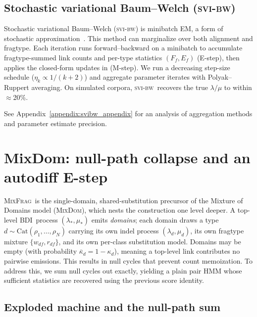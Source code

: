 \documentclass{article}
\newcommand{\MixFrag}{\textsc{MixFrag}}
\newcommand{\MixDom}{\textsc{MixDom}}
\newcommand{\BDI}{\textsc{BDI}}
\newcommand{\ins}{\lambda}
\newcommand{\del}{\mu}
\newcommand{\svibw}{\textsc{svi-bw}}
\begin{document}
\subsection{Stochastic variational Baum--Welch (\svibw)}
\label{sec:svibw}
Stochastic variational Baum--Welch (\svibw) is minibatch EM, a form of stochastic 
approximation~\cite{cappemoulines2009}. This method can marginalize over both 
alignment and fragtype. Each iteration runs forward--backward on a minibatch to 
accumulate fragtype-summed link counts and per-type statistics $(F_f,E_f)$ (E-step), 
then applies the closed-form updates in  (M-step). We run a decreasing step-size schedule ($\eta_k\propto 1/(k{+}2)$) and aggregate parameter iterates with Polyak--Ruppert averaging.
On simulated corpora, \svibw\ recovers the true $\ins/\del$ to within $\approx$20\%.

See Appendix~\ref{appendix:svibw_appendix} for an analysis of aggregation methods and parameter estimate precision.

\section{MixDom: null-path collapse and an autodiff E-step}
\label{sec:mixdom}

\MixFrag\ is the single-domain, shared-substitution precursor of the
Mixture of Domains model (\MixDom), which nests the construction one 
level deeper. A top-level \BDI\ process $(\ins_{\!*},\del_{\!*})$ emits 
\emph{domains}; each domain draws a type
$d\sim\mathrm{Cat}(\rho_1,\dots,\rho_N)$ carrying its own indel process
$(\ins_d,\del_d)$, its own fragtype mixture $\{w_{df},r_{df}\}$, and its
own per-class substitution model. 
Domains may be empty (with probability $\bar\kappa_d=1-\kappa_d$), 
meaning a top-level link contributes no pairwise emissions.
This results in null cycles that prevent count memoization. To address this,
we sum null cycles out exactly,
yielding a plain pair HMM whose sufficient statistics are recovered using the 
previous score identity.

\subsection{Exploded machine and the null-path sum}
\end{document}
